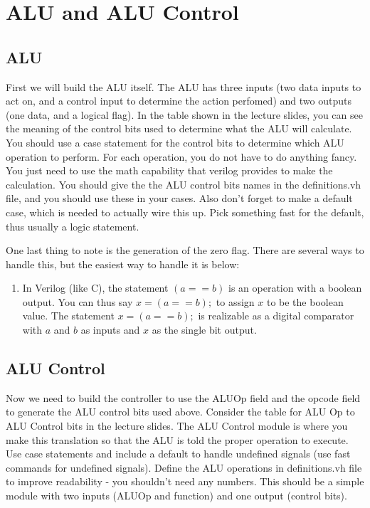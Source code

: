\chapter{ALU and ALU Control}

\section{ALU}

First we will build the ALU itself.  The ALU has three inputs (two data inputs to act on, and a control input to determine the action perfomed) and two outputs (one data, and a logical flag). In the table shown in the lecture slides, you can see the meaning of the control bits used to determine what the ALU will calculate.  You should use a case statement for the control bits to determine which ALU operation to perform.  For each operation, you do not have to do anything fancy.  You just need to use the math capability that verilog provides to make the calculation.  You should give the the ALU control bits names in the definitions.vh file, and you should use these in your cases.  Also don't forget to make a default case, which is needed to actually wire this up.  Pick something fast for the default, thus usually a logic statement.

One last thing to note is the generation of the zero flag.  There are several ways to handle this, but the easiest way to handle it is below: 
\begin{enumerate}
\item In Verilog (like C), the statement $(a==b)$ is an operation with a boolean output.  You can thus say $x=(a==b);$ to assign $x$ to be the boolean value.  The statement $x=(a==b);$ is realizable as a digital comparator with $a$ and $b$ as inputs and $x$ as the single bit output.
\end{enumerate}

\section{ALU Control}

Now we need to build the controller to use the ALUOp field and the opcode field to generate the ALU control bits used above.  Consider the table for ALU Op to ALU Control bits in the lecture slides.  The ALU Control module is where you make this translation so that the ALU is told the proper operation to execute.  Use case statements and include a default to handle undefined signals (use fast commands for undefined signals).  Define the ALU operations in definitions.vh file to improve readability - you shouldn't need any numbers.  This should be a simple module with two inputs (ALUOp and function) and one output (control bits).

